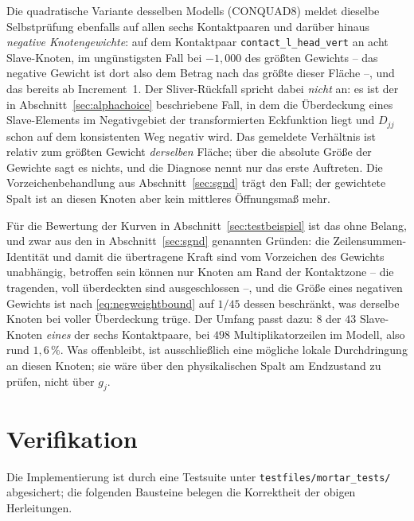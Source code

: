 \documentclass[a4paper,11pt]{article}
\def\tfrac#1#2{#1/#2}%
\def\tilde#1{#1}%
\newcommand{\code}[1]{\texttt{\small #1}}
\newcommand{\file}[1]{\texttt{\small #1}}
\let\stdsection\section
\renewcommand{\section}{\clearpage\stdsection}
\begin{document}
Die quadratische Variante desselben Modells (CONQUAD8) meldet dieselbe Selbstprüfung ebenfalls auf
allen sechs Kontaktpaaren und darüber hinaus \emph{negative Knotengewichte}: auf dem Kontaktpaar
\code{contact\_l\_head\_vert} an acht Slave-Knoten, im ungünstigsten Fall bei $-1{,}000$ des größten
Gewichts -- das negative Gewicht ist dort also dem Betrag nach das größte dieser Fläche --, und das
bereits ab Increment~1. Der Sliver-Rückfall spricht dabei \emph{nicht} an: es ist
der in Abschnitt~\ref{sec:alphachoice} beschriebene Fall, in dem die Überdeckung eines
Slave-Elements im Negativgebiet der transformierten Eckfunktion liegt und $\tilde D_{jj}$ schon auf
dem konsistenten Weg negativ wird. Das gemeldete Verhältnis ist relativ zum größten Gewicht
\emph{derselben} Fläche; über die absolute Größe der Gewichte sagt es nichts, und die Diagnose
nennt nur das erste Auftreten. Die Vorzeichenbehandlung aus Abschnitt~\ref{sec:sgnd} trägt den
Fall; der gewichtete Spalt ist an diesen Knoten aber kein mittleres Öffnungsmaß mehr.

Für die Bewertung der Kurven in Abschnitt~\ref{sec:testbeispiel} ist das ohne Belang, und zwar aus
den in Abschnitt~\ref{sec:sgnd} genannten Gründen: die Zeilensummen-Identität und damit die
übertragene Kraft sind vom Vorzeichen des Gewichts unabhängig, betroffen sein können nur Knoten am
Rand der Kontaktzone -- die tragenden, voll überdeckten sind ausgeschlossen --, und die Größe eines
negativen Gewichts ist nach \eqref{eq:negweightbound} auf $\tfrac{1}{45}$ dessen beschränkt, was
derselbe Knoten bei voller Überdeckung trüge. Der Umfang passt dazu: $8$ der $43$ Slave-Knoten
\emph{eines} der sechs Kontaktpaare, bei $498$ Multiplikatorzeilen im Modell, also rund
$1{,}6\,\%$.
Was offenbleibt, ist ausschließlich eine mögliche lokale Durchdringung an diesen Knoten; sie wäre
über den physikalischen Spalt am Endzustand zu prüfen, nicht über $\tilde g_j$.

\section{Verifikation}
\label{sec:verif}

Die Implementierung ist durch eine Testsuite unter \file{testfiles/mortar\_tests/} abgesichert; die
folgenden Bausteine belegen die Korrektheit der obigen Herleitungen.
\end{document}
